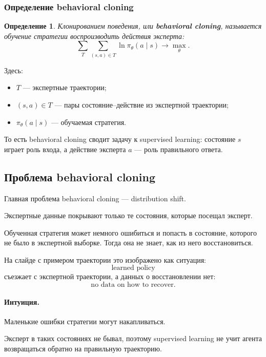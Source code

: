 \documentclass[12pt,a4paper]{article}
\newtheorem{definition}{Определение}
\begin{document}
\subsubsection{Определение behavioral cloning}

\begin{definition}
Клонированием поведения, или \textbf{behavioral cloning}, называется обучение стратегии воспроизводить действия эксперта:
\[
\sum_T
\sum_{(s,a)\in T}
\ln \pi_\theta(a\mid s)
\to
\max_\theta.
\]
\end{definition}

Здесь:
\begin{itemize}
    \item $T$ --- экспертные траектории;
    \item $(s,a)\in T$ --- пары состояние--действие из экспертной траектории;
    \item $\pi_\theta(a\mid s)$ --- обучаемая стратегия.
\end{itemize}

То есть behavioral cloning сводит задачу к supervised learning: состояние $s$ играет роль входа, а действие эксперта $a$ --- роль правильного ответа.

\subsection{Проблема behavioral cloning}

Главная проблема behavioral cloning --- distribution shift.

Экспертные данные покрывают только те состояния, которые посещал эксперт.

Обученная стратегия может немного ошибиться и попасть в состояние, которого не было в экспертной выборке. Тогда она не знает, как из него восстановиться.

На слайде с примером траектории это изображено как ситуация:
\[
\text{learned policy}
\]
съезжает с экспертной траектории, а данных о восстановлении нет:
\[
\text{no data on how to recover}.
\]

\paragraph{Интуиция.}

Маленькие ошибки стратегии могут накапливаться.

Эксперт в таких состояниях не бывал, поэтому supervised learning не учит агента возвращаться обратно на правильную траекторию.
\end{document}
